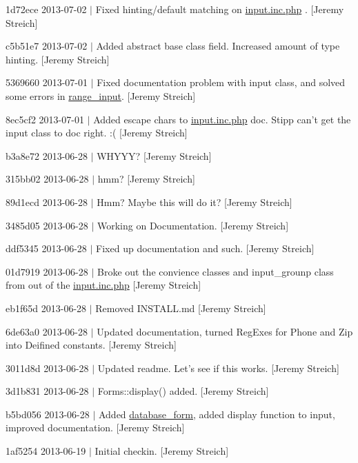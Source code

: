 \begin{DoxyItemize}
\item 1d72ece 2013-\/07-\/02 $|$ Fixed hinting/default matching on \hyperlink{input_8inc_8php}{input.\-inc.\-php} . \mbox{[}Jeremy Streich\mbox{]}
\item c5b51e7 2013-\/07-\/02 $|$ Added abstract base class field. Increased amount of type hinting. \mbox{[}Jeremy Streich\mbox{]}
\item 5369660 2013-\/07-\/01 $|$ Fixed documentation problem with input class, and solved some errors in \hyperlink{classrange__input}{range\-\_\-input}. \mbox{[}Jeremy Streich\mbox{]}
\item 8ec5cf2 2013-\/07-\/01 $|$ Added escape chars to \hyperlink{input_8inc_8php}{input.\-inc.\-php} doc. Stipp can't get the input class to doc right. \-:( \mbox{[}Jeremy Streich\mbox{]}
\item b3a8e72 2013-\/06-\/28 $|$ W\-H\-Y\-Y\-Y? \mbox{[}Jeremy Streich\mbox{]}
\item 315bb02 2013-\/06-\/28 $|$ hmm? \mbox{[}Jeremy Streich\mbox{]}
\item 89d1ecd 2013-\/06-\/28 $|$ Hmm? Maybe this will do it? \mbox{[}Jeremy Streich\mbox{]}
\item 3485d05 2013-\/06-\/28 $|$ Working on Documentation. \mbox{[}Jeremy Streich\mbox{]}
\item ddf5345 2013-\/06-\/28 $|$ Fixed up documentation and such. \mbox{[}Jeremy Streich\mbox{]}
\item 01d7919 2013-\/06-\/28 $|$ Broke out the convience classes and input\-\_\-grounp class from out of the \hyperlink{input_8inc_8php}{input.\-inc.\-php} \mbox{[}Jeremy Streich\mbox{]}
\item eb1f65d 2013-\/06-\/28 $|$ Removed I\-N\-S\-T\-A\-L\-L.\-md \mbox{[}Jeremy Streich\mbox{]}
\item 6de63a0 2013-\/06-\/28 $|$ Updated documentation, turned Reg\-Exes for Phone and Zip into Deifined constants. \mbox{[}Jeremy Streich\mbox{]}
\item 3011d8d 2013-\/06-\/28 $|$ Updated readme. Let's see if this works. \mbox{[}Jeremy Streich\mbox{]}
\item 3d1b831 2013-\/06-\/28 $|$ Forms\-::display() added. \mbox{[}Jeremy Streich\mbox{]}
\item b5bd056 2013-\/06-\/28 $|$ Added \hyperlink{classdatabase__form}{database\-\_\-form}, added display function to input, improved documentation. \mbox{[}Jeremy Streich\mbox{]}
\item 1af5254 2013-\/06-\/19 $|$ Initial checkin. \mbox{[}Jeremy Streich\mbox{]} 
\end{DoxyItemize}